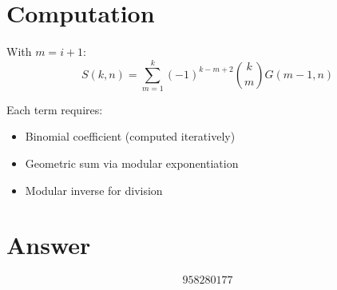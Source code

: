 \documentclass[12pt]{article}
\begin{document}
\section{Computation}

With $m = i+1$:
\[
S(k,n) = \sum_{m=1}^{k}(-1)^{k-m+2}\binom{k}{m}G(m-1,n)
\]

Each term requires:
\begin{itemize}
\item Binomial coefficient (computed iteratively)
\item Geometric sum via modular exponentiation
\item Modular inverse for division
\end{itemize}

\section{Answer}

\[
\boxed{958280177}
\]
\end{document}
